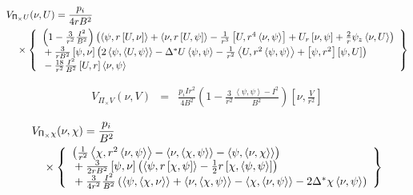 \documentclass[letterpaper]{book}
\newcommand{\tensor}[1]{\mathsf{#1}}
\renewcommand{\P}{\tensor{\Pi}}
\newcommand{\gs}[1]{\Delta^* #1}
\newcommand{\pb}[2]{\left[#1,#2\right]}
\newcommand{\ip}[2]{\left\langle  #1,#2\right\rangle}
\begin{document}
\begin{eqnarray*}
  & \lefteqn{V_{\P_\times U}(\nu, U) = \frac{p_i}{4 r B^2}} &
  \\ && \mbox{} \times 
  \left\{ \begin{array}{l}
    \left(1 - \frac{3}{r^2} \frac{I^2}{B^2} \right)
    \left( \ip{\psi}{r \pb{U}{\nu}}+\ip{\nu}{r \pb{U}{\psi}}
          -\frac{1}{r^3} \pb{U}{r^4 \ip{\nu}{\psi}}
	  +U_r \pb{\nu}{\psi} + \frac{2}{r} \psi_z \ip{\nu}{U} \right)
    \\ \mbox{} + 
    \frac{3}{r B^2} \pb{\psi}{\nu}
    \left( 2\ip{\psi}{\ip{U}{\psi}} - \gs{U}\ip{\psi}{\psi} 
          - \frac{1}{r^2}\ip{U}{r^2\ip{\psi}{\psi}} 
	  +\pb{\psi}{r^2}\pb{\psi}{U} \right)
    \\ \mbox{} - 
    \frac{18}{r^2} \frac{I^2}{B^2} \pb{U}{r} \ip{\nu}{\psi}
  \end{array} \right\}
\end{eqnarray*}

\begin{eqnarray*}
  V_{\P_\times V}(\nu, V) & = & \frac{p_i I r^2}{4 B^2}
  \left(1 - \frac{3}{r^2} \frac{\ip{\psi}{\psi} - I^2}{B^2} \right)
    \pb{\nu}{\frac{V}{r^2}}
\end{eqnarray*}

\begin{eqnarray*}
  & \lefteqn{V_{\P_\times \chi}(\nu, \chi) = \frac{p_i}{B^2}} &
  \\ && \mbox{} \times 
  \left\{ \begin{array}{l}
    \left( \frac{1}{r^2}\ip{\chi}{r^2 \ip{\nu}{\psi}}
          -\ip{\nu}{\ip{\chi}{\psi}} - \ip{\psi}{\ip{\nu}{\chi}} \right)
    \\ \mbox{} + \frac{3}{2 r B^2} \pb{\psi}{\nu}
    \left( \ip{\psi}{r \pb{\chi}{\psi}} 
         - \frac{1}{2} r \pb{\chi}{\ip{\psi}{\psi}} \right)
    \\ \mbox{} + \frac{3}{4 r^2} \frac{I^2}{B^2}
    \left( \ip{\psi}{\ip{\chi}{\nu}} + \ip{\nu}{\ip{\chi}{\psi}}
          -\ip{\chi}{\ip{\nu}{\psi}} - 2 \gs{\chi}\ip{\nu}{\psi} \right)
  \end{array} \right\}
\end{eqnarray*}
\end{document}
